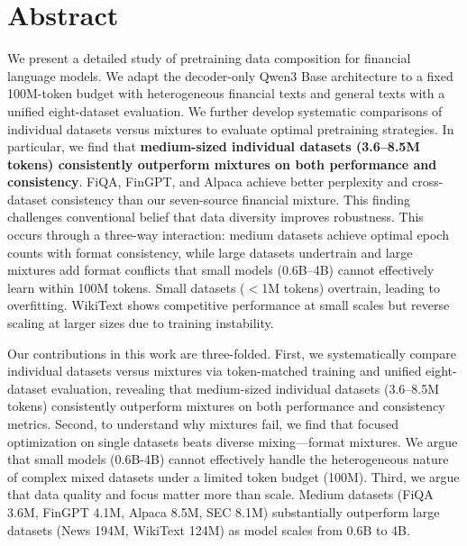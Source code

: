 \documentclass[11pt,a4paper,english,oneside]{book}
\begin{document}
\thispagestyle{empty}
\titleGP

\newpage

\setcounter{page}{1}

\section*{Abstract}
\thispagestyle{firststyle}

We present a detailed study of pretraining data composition for financial language models. We adapt the decoder-only Qwen3 Base architecture to a fixed 100M-token budget with heterogeneous financial texts and general texts with a unified eight-dataset evaluation. We further develop systematic comparisons of individual datasets versus mixtures to evaluate optimal pretraining strategies. In particular, we find that \textbf{medium-sized individual datasets (3.6–8.5M tokens) consistently outperform mixtures on both performance and consistency}. FiQA, FinGPT, and Alpaca achieve better perplexity and cross-dataset consistency than our seven-source financial mixture. This finding challenges conventional belief that data diversity improves robustness. This occurs through a three-way interaction: medium datasets achieve optimal epoch counts with format consistency, while large datasets undertrain and large mixtures add format conflicts that small models (0.6B–4B) cannot effectively learn within 100M tokens. Small datasets ($<$1M tokens) overtrain, leading to overfitting. WikiText shows competitive performance at small scales but reverse scaling at larger sizes due to training instability.

Our contributions in this work are three-folded. First, we systematically compare individual datasets versus mixtures via token-matched training and unified eight-dataset evaluation, revealing that medium-sized individual datasets (3.6–8.5M tokens) consistently outperform mixtures on both performance and consistency metrics. Second, to understand why mixtures fail, we find that focused optimization on single datasets beats diverse mixing—format mixtures. We argue that small models (0.6B-4B) cannot effectively handle the heterogeneous nature of complex mixed datasets under a limited token budget (100M). Third, we argue that data quality and focus matter more than scale. Medium datasets (FiQA 3.6M, FinGPT 4.1M, Alpaca 8.5M, SEC 8.1M) substantially outperform large datasets (News 194M, WikiText 124M) as model scales from 0.6B to 4B.
\end{document}
